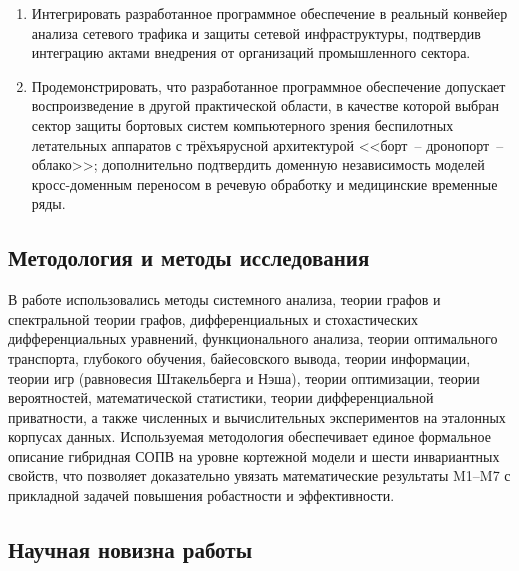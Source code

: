 \documentclass[12pt,a5paper]{article}
\begin{document}
\begin{enumerate}
\item Интегрировать разработанное программное обеспечение в
реальный конвейер анализа сетевого трафика и защиты сетевой
инфраструктуры, подтвердив интеграцию актами внедрения от
организаций промышленного сектора.

\item Продемонстрировать, что разработанное программное
обеспечение допускает воспроизведение в другой практической
области, в качестве которой выбран сектор защиты бортовых
систем компьютерного зрения беспилотных летательных аппаратов
с трёхъярусной архитектурой <<борт~-- дронопорт~-- облако>>;
дополнительно подтвердить доменную независимость моделей
кросс-доменным переносом в речевую обработку и медицинские
временные ряды.
\end{enumerate}

\subsection*{Методология и методы исследования}

В работе использовались методы системного анализа, теории
графов и спектральной теории графов, дифференциальных и
стохастических дифференциальных уравнений, функционального
анализа, теории оптимального транспорта, глубокого обучения,
байесовского вывода, теории информации, теории игр (равновесия
Штакельберга и Нэша), теории оптимизации, теории вероятностей,
математической статистики, теории дифференциальной
приватности, а также численных и вычислительных экспериментов
на эталонных корпусах данных. Используемая методология
обеспечивает единое формальное описание гибридная СОПВ на уровне
кортежной модели и шести инвариантных свойств, что позволяет
доказательно увязать математические результаты M1--M7 с
прикладной задачей повышения робастности и эффективности.

\subsection*{Научная новизна работы}
\end{document}
